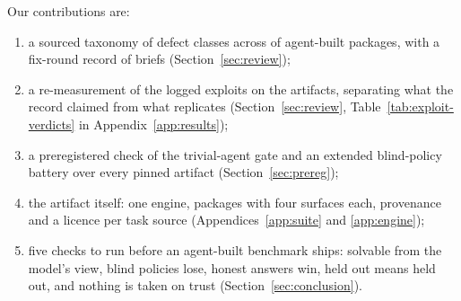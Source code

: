 Our contributions are:
\begin{enumerate}
\item a sourced taxonomy of  defect classes across  of \suitePackages{} agent-built packages, with a fix-round record of \reviewRoundsTotal{} briefs (Section~\ref{sec:review});
\item a re-measurement of the logged exploits on the artifacts, separating what the record claimed from what replicates (Section~\ref{sec:review}, Table~\ref{tab:exploit-verdicts} in Appendix~\ref{app:results});
\item a preregistered check of the trivial-agent gate and an extended blind-policy battery over every pinned artifact (Section~\ref{sec:prereg});
\item the artifact itself: one engine, \suitePackages{} packages with four surfaces each, provenance and a licence per task source (Appendices~\ref{app:suite} and \ref{app:engine});
\item five checks to run before an agent-built benchmark ships: solvable from the model's view, blind policies lose, honest answers win, held out means held out, and nothing is taken on trust (Section~\ref{sec:conclusion}).
\end{enumerate}
